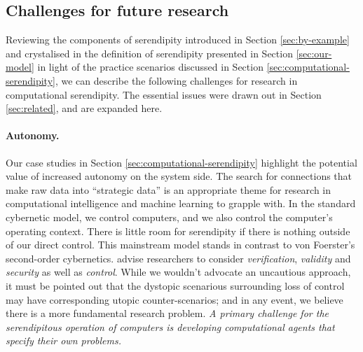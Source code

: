 

\subsection{Challenges for future research} \label{sec:recommendations}

Reviewing the components of serendipity introduced in Section
\ref{sec:by-example} and crystalised in the definition of serendipity
presented in Section \ref{sec:our-model} in light of the practice
scenarios discussed in Section \ref{sec:computational-serendipity}, we
can describe the following challenges for research in computational
serendipity.  The essential issues were drawn out in Section \ref{sec:related}, and are expanded here.

\paragraph{\textbf{Autonomy}.} Our case studies in Section
  \ref{sec:computational-serendipity} highlight the potential value of
  increased autonomy on the system side.  The search for connections
  that make raw data into ``strategic data'' is an appropriate theme
  for research in computational intelligence and machine learning to
  grapple with.  In the standard cybernetic model, we control
  computers, and we also control the computer's operating context.
  There is little room for serendipity if there is nothing outside of
  our direct control.  This mainstream model stands in contrast to von
  Foerster's \citeyear{von2003cybernetics} second-order
  cybernetics.   advise researchers to
  consider \emph{verification}, \emph{validity} and \emph{security} as
  well as \emph{control}.  While we wouldn't advocate an uncautious
  approach, it must be pointed out that the dystopic scenarious
  surrounding loss of control may have corresponding utopic
  counter-scenarios; and in any event, we believe there is a more
  fundamental research problem.  \emph{A primary challenge for
    the serendipitous operation of computers is developing
    computational agents that specify their own problems.}

